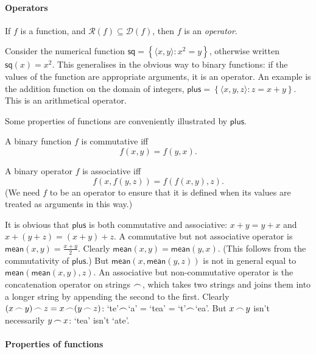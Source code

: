 \paragraph{Operators}
\begin{definition}[Operator]\label{operator}
	If $f$ is a function, and $\mathcal{R}(f) \subseteq \mathcal{D}(f)$, then $f$ is an \emph{operator}.
\end{definition}
Consider the numerical function $\mathsf{sq} = \left\{\langle x,y\rangle: x^{2} = y\right\}$, otherwise written $\mathsf{sq}(x) = x^2$. This generalises in the obvious way to binary functions: if the values of the function are appropriate arguments, it is an operator. An example is the addition function on the domain of integers, $\mathsf{plus} = \left\{\langle x, y, z\rangle : z = x + y\right\}$. This is an arithmetical operator.

Some properties of functions are conveniently illustrated by $\mathsf{plus}$.
\begin{definition}[Commutative]
	A binary function $f$ is commutative iff $$f(x,y) = f(y,x).$$  
\end{definition}
\begin{definition}[Associative]
	A binary operator $f$ is associative iff $$f(x,f(y,z)) = f(f(x,y),z).$$ (We need $f$ to be an operator to ensure that it is defined when its values are treated as arguments in this way.)
\end{definition}
It is obvious that $\mathsf{plus}$ is both commutative and associative: $x+y=y+x$ and $x+(y+z)=(x+y)+z$. A commutative but not associative operator is $\mathsf{mean}(x,y) = \tfrac{x+y}{2}$. Clearly $\mathsf{mean}(x,y)=\mathsf{mean}(y,x)$. (This follows from the commutativity of $\mathsf{plus}$.) But $\mathsf{mean}(x,\mathsf{mean}(y,z))$ is not in general equal to $\mathsf{mean}(\mathsf{mean}(x,y),z)$. An associative but non-commutative operator is the concatenation operator on strings $\mathop{\frown}$, which takes two strings and joins them into a longer string by appending the second to the first. Clearly $(x\mathop{\frown} y)\mathop{\frown} z = x \mathop{\frown} (y\mathop{\frown} z)$: `te'$\mathop{\frown}$`a' = `tea' = `t'$\mathop{\frown}$`ea'. But $x\mathop{\frown} y$ isn't necessarily $y\mathop{\frown} x$: `tea' isn't `ate'.



\paragraph{Properties of functions}

